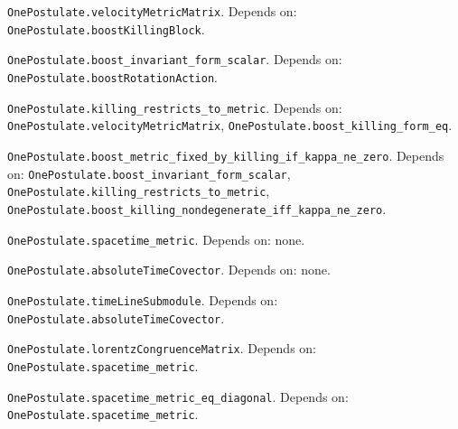 \begin{definition}\label{OnePostulate.velocityMetricMatrix}
\texttt{OnePostulate.velocityMetricMatrix}. Depends on: \texttt{OnePostulate.boostKillingBlock}.
\end{definition}

\begin{lemma}\label{OnePostulate.boost_invariant_form_scalar}
\texttt{OnePostulate.boost\_invariant\_form\_scalar}. Depends on: \texttt{OnePostulate.boostRotationAction}.
\end{lemma}

\begin{lemma}\label{OnePostulate.killing_restricts_to_metric}
\texttt{OnePostulate.killing\_restricts\_to\_metric}. Depends on: \texttt{OnePostulate.velocityMetricMatrix}, \texttt{OnePostulate.boost\_killing\_form\_eq}.
\end{lemma}

\begin{lemma}\label{OnePostulate.boost_metric_fixed_by_killing_if_kappa_ne_zero}
\texttt{OnePostulate.boost\_metric\_fixed\_by\_killing\_if\_kappa\_ne\_zero}. Depends on: \texttt{OnePostulate.boost\_invariant\_form\_scalar}, \texttt{OnePostulate.killing\_restricts\_to\_metric}, \texttt{OnePostulate.boost\_killing\_nondegenerate\_iff\_kappa\_ne\_zero}.
\end{lemma}

\begin{definition}\label{OnePostulate.spacetime_metric}
\texttt{OnePostulate.spacetime\_metric}. Depends on: none.
\end{definition}

\begin{definition}\label{OnePostulate.absoluteTimeCovector}
\texttt{OnePostulate.absoluteTimeCovector}. Depends on: none.
\end{definition}

\begin{definition}\label{OnePostulate.timeLineSubmodule}
\texttt{OnePostulate.timeLineSubmodule}. Depends on: \texttt{OnePostulate.absoluteTimeCovector}.
\end{definition}

\begin{definition}\label{OnePostulate.lorentzCongruenceMatrix}
\texttt{OnePostulate.lorentzCongruenceMatrix}. Depends on: \texttt{OnePostulate.spacetime\_metric}.
\end{definition}

\begin{lemma}\label{OnePostulate.spacetime_metric_eq_diagonal}
\texttt{OnePostulate.spacetime\_metric\_eq\_diagonal}. Depends on: \texttt{OnePostulate.spacetime\_metric}.
\end{lemma}

